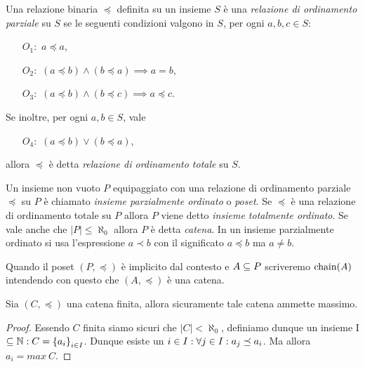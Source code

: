 \begin{definizione}  
Una relazione binaria $\preceq$ definita su un insieme
$S$ \`e una \emph{relazione di ordinamento parziale} su $S$
se le seguenti condizioni valgono in $S$,
per ogni $a, b, c \in S$:
\begin{itemize}
\item[$O_1:$] $a \preceq a$,
\item[$O_2:$] $(a \preceq b) \land (b \preceq a) \implies a = b$,
\item[$O_3:$] $(a \preceq b) \land (b \preceq c) \implies a \preceq c$.
\end{itemize}
Se inoltre, per ogni $a, b \in S$, vale
\begin{itemize}
\item[$O_4:$] $(a \preceq b) \lor (b \preceq a)$,
\end{itemize}
allora $\preceq$ \`e detta \emph{relazione di ordinamento totale} su $S$.
\end{definizione}

\begin{definizione} 
Un insieme non vuoto $P$ equipaggiato con una relazione di ordinamento
parziale $\preceq$ su $P$ \`e chiamato
\emph{insieme parzialmente ordinato} o \emph{poset}.
Se $\preceq$ \`e una relazione di
ordinamento totale su $P$ allora $P$ viene detto
\emph{insieme totalmente ordinato}. Se vale anche che $|P| \leq \aleph _0$ allora $P$ è detta \emph{catena}.
In un insieme parzialmente
ordinato si usa l'espressione $a \prec b$ con il significato $a\preceq b$ ma
$a \neq b$.
\end{definizione}

Quando il poset $(P, \preceq)$ \`e implicito dal contesto
e $A \subseteq P$ scriveremo $\mathop{\mathrm{chain}}\nolimits(A)$ intendendo con questo
che $(A, \preceq)$ \`e una catena.

\begin{proposizione} 
Sia $(C, \preceq)$ una catena finita, allora sicuramente tale catena ammette massimo.
\end{proposizione}
\begin{proof}
Essendo $C$ finita siamo sicuri che $|C| < \aleph_0$, definiamo dunque un insieme I $\subseteq \mathbb{N} \mathrel{:} C = \left\{a_i\right\}_{i \in I}$. Dunque esiste un $i \in I \mathrel{:} \forall j \in I \mathrel{:} a_j \preceq a_i$. Ma allora $a_i = max\ C$.
\end{proof}


